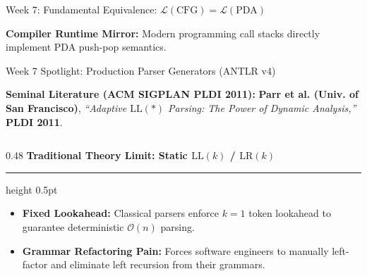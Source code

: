 \documentclass[aspectratio=169, 10pt]{beamer}
\newcommand{\colheader}[1]{%
  {\noindent\footnotesize\bfseries\color{gimpanavy}#1}%
  \vspace{0.03cm}%
  {\color{gimpanavy!30}\hrule height 0.5pt}%
  \vspace{0.08cm}%
}
\begin{document}
\begin{frame}{Week 7: Fundamental Equivalence: $\mathcal{L}(\text{CFG}) = \mathcal{L}(\text{PDA})$}
  \vspace{0.08cm}
  \begin{center}
    {\footnotesize\color{charcoalText}\textbf{Compiler Runtime Mirror:} Modern programming call stacks directly implement PDA push-pop semantics.}
  \end{center}
\end{frame}

\begin{frame}{Week 7 Spotlight: Production Parser Generators (ANTLR v4)}
  \begin{tcolorbox}[spotlightcard, top=2pt, bottom=2pt, before=\vspace{0pt}, after=\vspace{2pt}]
    \footnotesize
    \textbf{Seminal Literature (ACM SIGPLAN PLDI 2011):} 
    \textbf{Parr et al. (Univ. of San Francisco)}, \textit{``Adaptive $\text{LL}(*)$ Parsing: The Power of Dynamic Analysis,''} \textbf{PLDI 2011}.
  \end{tcolorbox}

  \vspace{0.04cm}
  \begin{columns}[T]
    \begin{column}{0.48\textwidth}
      \colheader{Traditional Theory Limit: Static $\text{LL}(k)$ / $\text{LR}(k)$}
      \begin{tcolorbox}[conceptcard, top=3pt, bottom=3pt]
        \begin{itemize}\setlength{\itemsep}{2.5pt}\footnotesize
          \item \textbf{Fixed Lookahead:} Classical parsers enforce $k = 1$ token lookahead to guarantee deterministic $\mathcal{O}(n)$ parsing.
          \item \textbf{Grammar Refactoring Pain:} Forces software engineers to manually left-factor and eliminate left recursion from their grammars.
        \end{itemize}
      \end{tcolorbox}
    \end{column}

    \hfill


\end{columns}
\end{frame}
\end{document}

